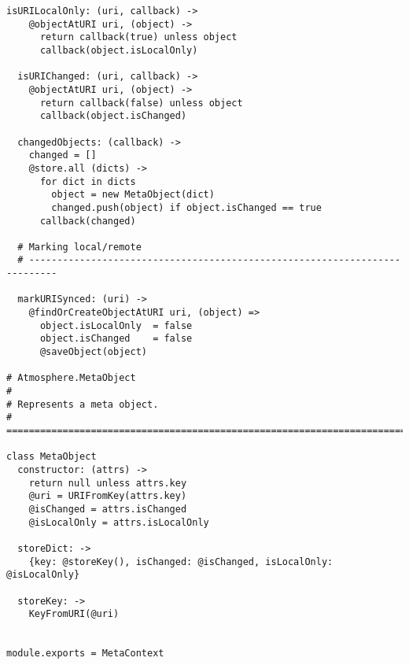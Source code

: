 \begin{lstlisting}[caption=meta_context.coffee]
  isURILocalOnly: (uri, callback) ->
    @objectAtURI uri, (object) ->
      return callback(true) unless object
      callback(object.isLocalOnly)
  
  isURIChanged: (uri, callback) ->
    @objectAtURI uri, (object) ->
      return callback(false) unless object
      callback(object.isChanged)
  
  changedObjects: (callback) ->
    changed = []
    @store.all (dicts) ->
      for dict in dicts
        object = new MetaObject(dict)
        changed.push(object) if object.isChanged == true
      callback(changed)
  
  # Marking local/remote
  # ---------------------------------------------------------------------------
  
  markURISynced: (uri) ->
    @findOrCreateObjectAtURI uri, (object) =>
      object.isLocalOnly  = false
      object.isChanged    = false
      @saveObject(object)

# Atmosphere.MetaObject
#
# Represents a meta object.
# =============================================================================  

class MetaObject
  constructor: (attrs) ->
    return null unless attrs.key
    @uri = URIFromKey(attrs.key)
    @isChanged = attrs.isChanged
    @isLocalOnly = attrs.isLocalOnly
  
  storeDict: ->
    {key: @storeKey(), isChanged: @isChanged, isLocalOnly: @isLocalOnly}
  
  storeKey: ->
    KeyFromURI(@uri)
    

module.exports = MetaContext
\end{lstlisting}

